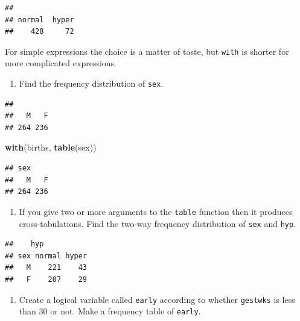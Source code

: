 \documentclass[
]{book}
\newenvironment{Shaded}{\begin{snugshade}}{\end{snugshade}}
\newcommand{\FunctionTok}[1]{\textcolor[rgb]{0.13,0.29,0.53}{\textbf{#1}}}
\newcommand{\NormalTok}[1]{#1}
\newcommand{\SpecialCharTok}[1]{\textcolor[rgb]{0.81,0.36,0.00}{\textbf{#1}}}
\providecommand{\tightlist}{%
  \setlength{\itemsep}{0pt}\setlength{\parskip}{0pt}}
\theoremstyle{definition}
\theoremstyle{definition}
\theoremstyle{definition}
\theoremstyle{definition}
\theoremstyle{remark}
\begin{document}
\begin{verbatim}
## 
## normal  hyper 
##    428     72
\end{verbatim}

For simple expressions the choice is a matter of taste, but \texttt{with}
is shorter for more complicated expressions.

\begin{enumerate}
\def\labelenumi{\arabic{enumi}.}
\tightlist
\item
  Find the frequency distribution of \texttt{sex}.
\end{enumerate}

\begin{Shaded}
\end{Shaded}

\begin{verbatim}
## 
##   M   F 
## 264 236
\end{verbatim}

\begin{Shaded}
\begin{Highlighting}[]
\FunctionTok{with}\NormalTok{(births, }\FunctionTok{table}\NormalTok{(sex))}
\end{Highlighting}
\end{Shaded}

\begin{verbatim}
## sex
##   M   F 
## 264 236
\end{verbatim}

\begin{enumerate}
\def\labelenumi{\arabic{enumi}.}
\setcounter{enumi}{1}
\tightlist
\item
  If you give two or more arguments to the \texttt{table} function
  then it produces cross-tabulations. Find the two-way frequency
  distribution of \texttt{sex} and \texttt{hyp}.
\end{enumerate}

\begin{verbatim}
##    hyp
## sex normal hyper
##   M    221    43
##   F    207    29
\end{verbatim}

\begin{enumerate}
\def\labelenumi{\arabic{enumi}.}
\setcounter{enumi}{2}
\tightlist
\item
  Create a logical variable called \texttt{early} according to whether \texttt{gestwks}
  is less than 30 or not. Make a frequency table of \texttt{early}.
\end{enumerate}
\end{document}
